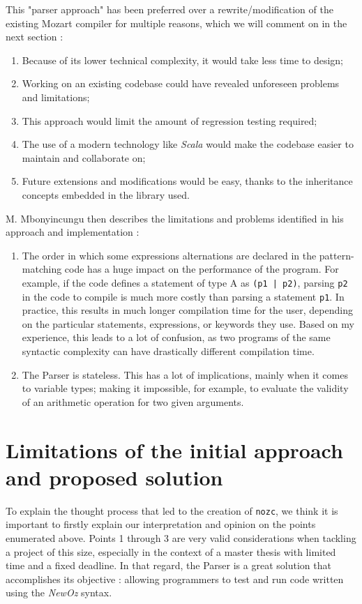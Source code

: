 This "parser approach" has been preferred over a rewrite/modification of the existing Mozart compiler for multiple reasons, which we will comment on in the next section :
\begin{enumerate}
    \item Because of its lower technical complexity, it would take less time to design;
    \item Working on an existing codebase could have revealed unforeseen problems and limitations;
    \item This approach would limit the amount of regression testing required;
    \item The use of a modern technology like \textit{Scala} would make the codebase easier to maintain and collaborate on;
    \item Future extensions and modifications would be easy, thanks to the inheritance concepts embedded in the library used.
\end{enumerate}
M. Mbonyincungu then describes the limitations and problems identified in his approach and implementation :
\begin{enumerate}[resume]
    \item The order in which some expressions alternations are declared in the pattern-matching code has a huge impact on the performance of the program.
    For example, if the code defines a statement of type A as \texttt{(p1 | p2)}, parsing \texttt{p2} in the code to compile is much more costly than parsing a statement \texttt{p1}.
    In practice, this results in much longer compilation time for the user, depending on the particular statements, expressions, or keywords they use.
    Based on my experience, this leads to a lot of confusion, as two programs of the same syntactic complexity can have drastically different compilation time.
    \item The Parser is stateless.
    This has a lot of implications, mainly when it comes to variable types;
    making it impossible, for example, to evaluate the validity of an arithmetic operation for two given arguments.
\end{enumerate}

\section{Limitations of the initial approach and proposed solution}\label{sec:ch3-problems}
To explain the thought process that led to the creation of \texttt{nozc}, we think it is important to firstly explain our interpretation and opinion on the points enumerated above.
Points 1 through 3 are very valid considerations when tackling a project of this size, especially in the context of a master thesis with limited time and a fixed deadline.
In that regard, the Parser is a great solution that accomplishes its objective : allowing programmers to test and run code written using the \textit{NewOz} syntax.\newline

